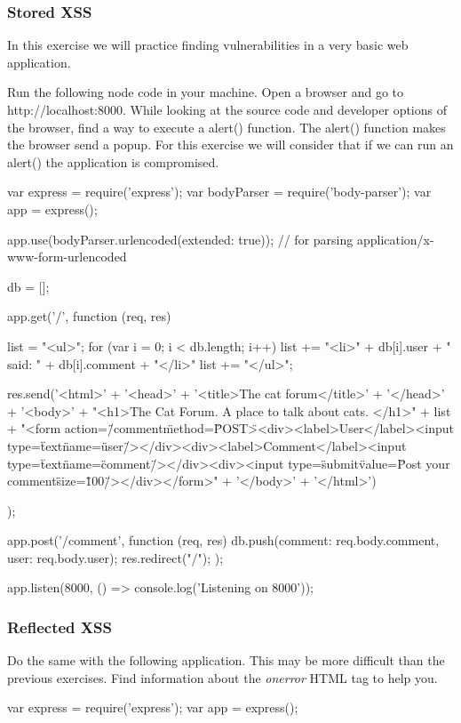 
\begin{Exercise}[label={websec-xss-types}]
\subsubsection{Stored XSS}
In this exercise we will practice finding vulnerabilities in a very basic web application.

Run the following node code in your machine. Open a browser and go to http://localhost:8000. While looking at the source code and developer options of the browser, find a way to execute a alert() function. The alert() function makes the browser send a popup. For this exercise we will consider that if we can run an alert() the application is compromised.

\begin{js}
var express = require('express');
var bodyParser = require('body-parser');
var app = express();

app.use(bodyParser.urlencoded({extended: true})); // for parsing application/x-www-form-urlencoded

db = [];

app.get('/', function (req, res) {
list = "<ul>";
for (var i = 0; i < db.length; i++) {
  list += "<li>" + db[i].user + " said: " + db[i].comment + "</li>"
  }
list += "</ul>";

res.send('<html>' +
  '<head>' +
  '<title>The cat forum</title>' +
  '</head>' +
  '<body>' +
  "<h1>The Cat Forum. A place to talk about cats. </h1>" +
  list +
  "<form action=\"/comment\" method=\"POST\"><div><label>User</label><input type=\"text\" name=\"user\"/></div><div><label>Comment</label><input type=\"text\" name=\"comment\"/></div><div><input type=\"submit\" value=\"Post your comment\" size=\"100\"/></div></form>" +
  '</body>' +
  '</html>')
});

app.post('/comment', function (req, res) {
  db.push({comment: req.body.comment, user: req.body.user});
  res.redirect("/");
});

app.listen(8000, () => console.log('Listening on 8000'));
\end{js}

\subsubsection{Reflected XSS}
Do the same with the following application. This may be more difficult than the previous exercises. Find information about the \textit{onerror} HTML tag to help you.
\begin{js}
var express = require('express');
var app = express();


\end{js}
\end{Exercise}
